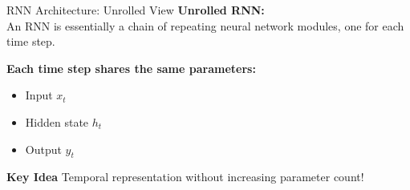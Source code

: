\begin{frame}{RNN Architecture: Unrolled View}
    \textbf{Unrolled RNN:} \\
    An RNN is essentially a chain of repeating neural network modules, one for each time step.







    \vspace{0.5em}
    \textbf{Each time step shares the same parameters:}
    \begin{itemize}
        \item Input $x_t$
        \item Hidden state $h_t$
        \item Output $y_t$
    \end{itemize}

    \begin{block}{\textbf{Key Idea}}
        Temporal representation without increasing parameter count!
    \end{block}
\end{frame}


